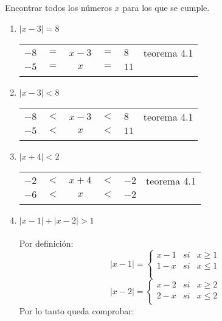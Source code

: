 \begin{ej}
Encontrar todos los números $x$ para los que se cumple.
\begin{enumerate}[\bfseries (i)]
\item $|x-3|=8$
\begin{center}
\begin{tabular}{rcccll}
$-8$&$=$&$x-3$&$=$&$8$&teorema 4.1\\
$-5$&$=$&$x$&$=$&$11$&\\\\
\end{tabular}
\end{center}
\item $|x-3|<8$
\begin{center}
\begin{tabular}{rcccll}
$-8$&$<$&$x-3$&$<$&$8$&teorema 4.1\\
$-5$&$<$&$x$&$<$&$11$&\\\\
\end{tabular}
\end{center}
\item $|x+4|<2$
\begin{center}
\begin{tabular}{rcccll}
$-2$&$<$&$x+4$&$<$&$-2$&teorema 4.1\\
$-6$&$<$&$x$&$<$&$-2$&\\\\
\end{tabular}
\end{center}
\item $|x-1|+|x-2|>1$\\\\
Por definición:
\begin{equation}
|x-1| = \left\lbrace
\begin{array}{rcr}
  x-1& si & x\geq 1\\
 1-x& si & x \leq 1\\\\
\end{array}
\right.
\end{equation}
\begin{equation}
|x-2| = \left\lbrace
\begin{array}{rcr}
  x-2& si & x\geq 2\\
 2-x& si & x \leq 2\\
\end{array}
\right.
\end{equation}
Por lo tanto queda comprobar:\\

\end{enumerate}
\end{ej}

